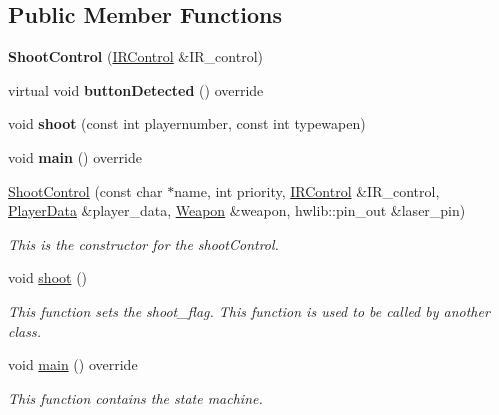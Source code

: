 \subsection*{Public Member Functions}
\begin{DoxyCompactItemize}
\item 
\mbox{\label{class_shoot_control_a90a3fa56f1c3a7131c95eab240794f28}} 
{\bfseries Shoot\+Control} (\mbox{\hyperlink{class_i_r_control}{I\+R\+Control}} \&I\+R\+\_\+control)
\item 
\mbox{\label{class_shoot_control_ab5a9b55187693bdb2f49c4ae4a5de039}} 
virtual void {\bfseries button\+Detected} () override
\item 
\mbox{\label{class_shoot_control_ad4fbd66576dc4389d57d00aaa414fca8}} 
void {\bfseries shoot} (const int playernumber, const int typewapen)
\item 
\mbox{\label{class_shoot_control_afda9df061db3b34fdf9affed32f2c325}} 
void {\bfseries main} () override
\item 
\mbox{\hyperlink{class_shoot_control_af9c21b16c798f217b2da762d569473cd}{Shoot\+Control}} (const char $\ast$name, int priority, \mbox{\hyperlink{class_i_r_control}{I\+R\+Control}} \&I\+R\+\_\+control, \mbox{\hyperlink{class_player_data}{Player\+Data}} \&player\+\_\+data, \mbox{\hyperlink{class_weapon}{Weapon}} \&weapon, hwlib\+::pin\+\_\+out \&laser\+\_\+pin)
\begin{DoxyCompactList}\small\item\em This is the constructor for the shoot\+Control. \end{DoxyCompactList}\item 
\mbox{\label{class_shoot_control_a17f6db4ed8fb3a7195e03eb54b9c26f1}} 
void \mbox{\hyperlink{class_shoot_control_a17f6db4ed8fb3a7195e03eb54b9c26f1}{shoot}} ()
\begin{DoxyCompactList}\small\item\em This function sets the shoot\+\_\+flag.  This function is used to be called by another class. \end{DoxyCompactList}\item 
void \mbox{\hyperlink{class_shoot_control_afda9df061db3b34fdf9affed32f2c325}{main}} () override
\begin{DoxyCompactList}\small\item\em This function contains the state machine. \end{DoxyCompactList}\end{DoxyCompactItemize}


